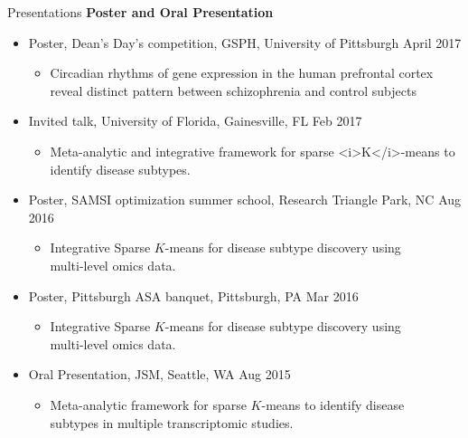\documentclass{resume} %
\begin{document}
\begin{rSection}{Presentations}
\textbf{Poster and Oral Presentation}

\begin{itemize}[noitemsep,topsep=0pt]
\item  Poster, Dean's Day's competition, GSPH, University of Pittsburgh \hfill {April 2017}
\begin{itemize}[noitemsep,topsep=0pt]
\item{Circadian rhythms of gene expression in the human prefrontal cortex \\reveal distinct pattern between schizophrenia and control subjects}
\end{itemize}

\item  Invited talk, University of Florida, Gainesville, FL \hfill {Feb 2017}
\begin{itemize}[noitemsep,topsep=0pt]
\item{Meta-analytic and integrative framework for sparse <i>K</i>-means to identify disease subtypes.}
\end{itemize}

\item Poster, SAMSI optimization summer school,  Research Triangle Park, NC  \hfill {Aug 2016}
\begin{itemize}[noitemsep,topsep=0pt]
\item{Integrative Sparse $K$-means for disease subtype discovery using \\multi-level omics data.}
\end{itemize}

\item Poster, Pittsburgh ASA banquet, Pittsburgh, PA \hfill {Mar 2016}
\begin{itemize}[noitemsep,topsep=0pt]
\item{Integrative Sparse $K$-means for disease subtype discovery using \\multi-level omics data.}
\end{itemize}

\item Oral Presentation, JSM, Seattle, WA \hfill {Aug 2015}
\begin{itemize}[noitemsep,topsep=0pt]
\item{Meta-analytic framework for sparse $K$-means to identify disease\\ subtypes in multiple transcriptomic studies.}
\end{itemize}


\end{itemize}
\end{rSection}
\end{document}
